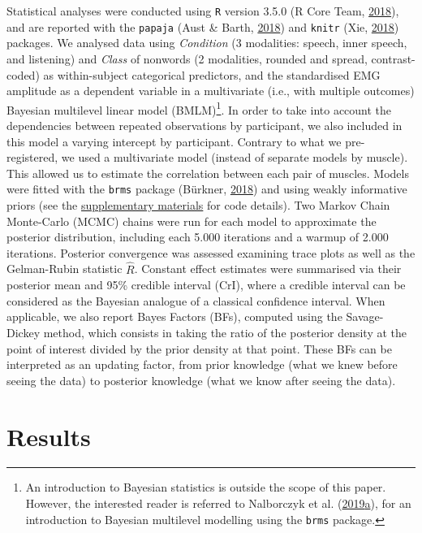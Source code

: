 \documentclass[a4paper,12pt,twoside,openright,oldfontcommands,final]{memoir}
\let\rmarkdownfootnote\footnote%
\def\footnote{\protect\rmarkdownfootnote}
\begin{document}
Statistical analyses were conducted using \texttt{R} version 3.5.0 (R Core Team, \protect\hyperlink{ref-R-base}{2018}), and are reported with the \texttt{papaja} (Aust \& Barth, \protect\hyperlink{ref-R-papaja}{2018}) and \texttt{knitr} (Xie, \protect\hyperlink{ref-R-knitr}{2018}) packages. We analysed data using \emph{Condition} (3 modalities: speech, inner speech, and listening) and \emph{Class} of nonwords (2 modalities, rounded and spread, contrast-coded) as within-subject categorical predictors, and the standardised EMG amplitude as a dependent variable in a multivariate (i.e., with multiple outcomes) Bayesian multilevel linear model (BMLM)\footnote{An introduction to Bayesian statistics is outside the scope of this paper. However, the interested reader is referred to Nalborczyk et al. (\protect\hyperlink{ref-nalborczyk_introduction_2019}{2019}\protect\hyperlink{ref-nalborczyk_introduction_2019}{a}), for an introduction to Bayesian multilevel modelling using the \texttt{brms} package.}. In order to take into account the dependencies between repeated observations by participant, we also included in this model a varying intercept by participant. Contrary to what we pre-registered, we used a multivariate model (instead of separate models by muscle). This allowed us to estimate the correlation between each pair of muscles. Models were fitted with the \texttt{brms} package (Bürkner, \protect\hyperlink{ref-R-brms}{2018}) and using weakly informative priors (see the \protect\hyperlink{suppCh5}{supplementary materials} for code details). Two Markov Chain Monte-Carlo (MCMC) chains were run for each model to approximate the posterior distribution, including each 5.000 iterations and a warmup of 2.000 iterations. Posterior convergence was assessed examining trace plots as well as the Gelman-Rubin statistic \(\hat{R}\). Constant effect estimates were summarised via their posterior mean and 95\% credible interval (CrI), where a credible interval can be considered as the Bayesian analogue of a classical confidence interval. When applicable, we also report Bayes Factors (BFs), computed using the Savage-Dickey method, which consists in taking the ratio of the posterior density at the point of interest divided by the prior density at that point. These BFs can be interpreted as an updating factor, from prior knowledge (what we knew before seeing the data) to posterior knowledge (what we know after seeing the data).

\hypertarget{results-2}{%
\section{Results}\label{results-2}}
\end{document}
